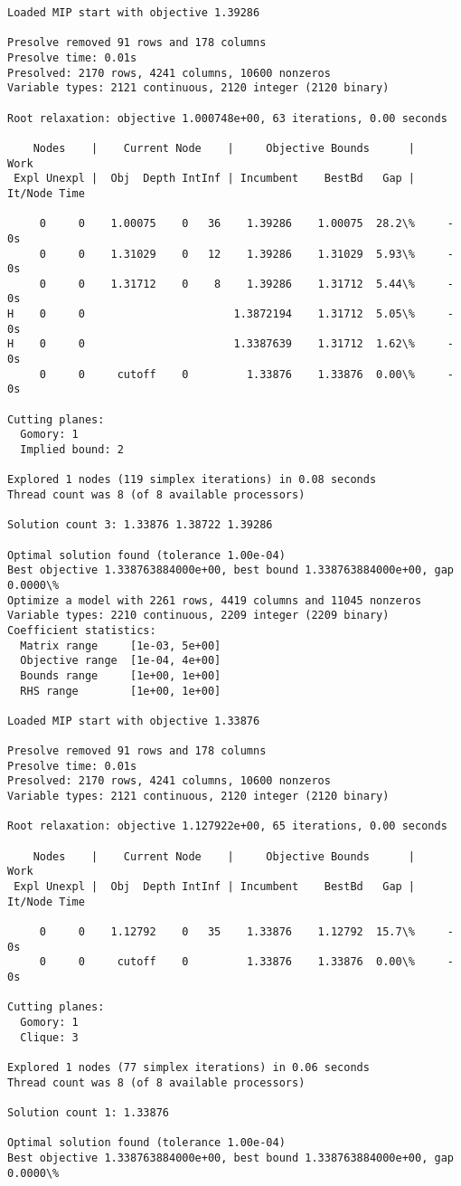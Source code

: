 \documentclass[11pt]{article}
\begin{document}
\begin{Verbatim}[commandchars=\\\{\}]
Loaded MIP start with objective 1.39286

Presolve removed 91 rows and 178 columns
Presolve time: 0.01s
Presolved: 2170 rows, 4241 columns, 10600 nonzeros
Variable types: 2121 continuous, 2120 integer (2120 binary)

Root relaxation: objective 1.000748e+00, 63 iterations, 0.00 seconds

    Nodes    |    Current Node    |     Objective Bounds      |     Work
 Expl Unexpl |  Obj  Depth IntInf | Incumbent    BestBd   Gap | It/Node Time

     0     0    1.00075    0   36    1.39286    1.00075  28.2\%     -    0s
     0     0    1.31029    0   12    1.39286    1.31029  5.93\%     -    0s
     0     0    1.31712    0    8    1.39286    1.31712  5.44\%     -    0s
H    0     0                       1.3872194    1.31712  5.05\%     -    0s
H    0     0                       1.3387639    1.31712  1.62\%     -    0s
     0     0     cutoff    0         1.33876    1.33876  0.00\%     -    0s

Cutting planes:
  Gomory: 1
  Implied bound: 2

Explored 1 nodes (119 simplex iterations) in 0.08 seconds
Thread count was 8 (of 8 available processors)

Solution count 3: 1.33876 1.38722 1.39286 

Optimal solution found (tolerance 1.00e-04)
Best objective 1.338763884000e+00, best bound 1.338763884000e+00, gap 0.0000\%
Optimize a model with 2261 rows, 4419 columns and 11045 nonzeros
Variable types: 2210 continuous, 2209 integer (2209 binary)
Coefficient statistics:
  Matrix range     [1e-03, 5e+00]
  Objective range  [1e-04, 4e+00]
  Bounds range     [1e+00, 1e+00]
  RHS range        [1e+00, 1e+00]

Loaded MIP start with objective 1.33876

Presolve removed 91 rows and 178 columns
Presolve time: 0.01s
Presolved: 2170 rows, 4241 columns, 10600 nonzeros
Variable types: 2121 continuous, 2120 integer (2120 binary)

Root relaxation: objective 1.127922e+00, 65 iterations, 0.00 seconds

    Nodes    |    Current Node    |     Objective Bounds      |     Work
 Expl Unexpl |  Obj  Depth IntInf | Incumbent    BestBd   Gap | It/Node Time

     0     0    1.12792    0   35    1.33876    1.12792  15.7\%     -    0s
     0     0     cutoff    0         1.33876    1.33876  0.00\%     -    0s

Cutting planes:
  Gomory: 1
  Clique: 3

Explored 1 nodes (77 simplex iterations) in 0.06 seconds
Thread count was 8 (of 8 available processors)

Solution count 1: 1.33876 

Optimal solution found (tolerance 1.00e-04)
Best objective 1.338763884000e+00, best bound 1.338763884000e+00, gap 0.0000\%

    \end{Verbatim}
\end{document}

